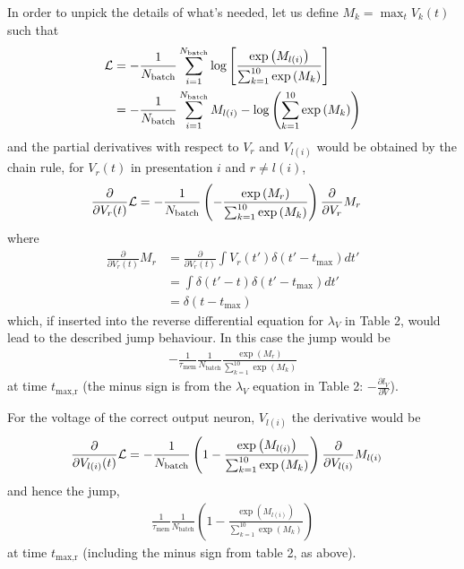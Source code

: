 \documentclass[a4paper]{article}
\begin{document}
In order to unpick the details of what's needed, let us define $M_k = \max_t V_k (t)$ such that
\begin{align}
  {\cal L} &= - \frac{1}{N_{\text{batch}}} \sum_{i=1}^{N_{\text{batch}}} \log \left[ \frac{\exp\left(M_{l(i)}\right)}{\sum_{k=1}^{10} \exp\left(M_{k}\right)} \right] \\
  &= - \frac{1}{N_{\text{batch}}} \sum_{i=1}^{N_{\text{batch}}} M_{l(i)} - \log\left(\sum_{k=1}^{10} \exp\left(M_{k}\right)\right) 
\end{align}
and the partial derivatives with respect to $V_r$ and $V_{l(i)}$ would be obtained by the chain rule, for $V_r(t)$ in presentation $i$ and $r \neq l(i)$,
\begin{align}
  \frac{\partial}{\partial V_r(t)} {\cal L} &= -\frac{1}{N_{\text{batch}}}  \left(-\frac{\exp\left(M_r\right)}{\sum_{k=1}^{10} \exp\left(M_{k}\right)}\right)\frac{\partial}{\partial V_r} M_r
\end{align}
where
\begin{align}
  \frac{\partial}{\partial V_r(t)} M_r &= \frac{\partial}{\partial V_r(t)}  \int V_r(t') \delta(t'-t_{\text{max}}) dt' \\
  &=  \int \delta(t'-t)\delta(t'-t_{\text{max}}) dt' \\
  &= \delta(t-t_{\text{max}})
\end{align}
which, if inserted into the reverse differential equation for $\lambda_V$ in Table 2, would lead to the described jump behaviour. In this case the jump would be
\begin{align}
 - \frac{1}{\tau_{\text{mem}}} \frac{1}{N_{\text{batch}}} \frac{\exp\left(M_r\right)}{\sum_{k=1}^{10} \exp\left(M_{k}\right)}
\end{align}
at time $t_{\text{max,r}}$ (the minus sign is from the $\lambda_V$ equation in Table 2: $-\frac{\partial l_V}{\partial V}$).

For the voltage of the correct output neuron, $V_{l(i)}$ the derivative would be
\begin{align}
  \frac{\partial}{\partial V_{l(i)}(t)} {\cal L} &= -\frac{1}{N_{\text{batch}}}  \left(1 - \frac{\exp\left(M_{l(i)}\right)}{\sum_{k=1}^{10} \exp\left(M_{k}\right)}\right)\frac{\partial}{\partial V_{l(i)}} M_{l(i)}
\end{align}
and hence the jump,
\begin{align}
\frac{1}{\tau_{\text{mem}}} \frac{1}{N_{\text{batch}}} \left(1 - \frac{\exp\left(M_{l(i)}\right)}{\sum_{k=1}^{10} \exp\left(M_{k}\right)}\right)
\end{align}
at time $t_{\text{max,r}}$ (including the minus sign from table 2, as above).
\end{document}
